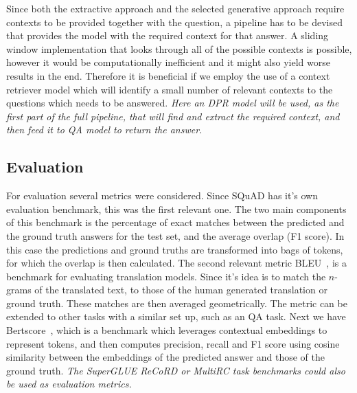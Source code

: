 \documentclass[fleqn,moreauthors,10pt]{ds_report}
\begin{document}
Since both the extractive approach and the selected generative approach require contexts to be provided together with the question, a pipeline has to be devised that provides the model with the required context for that answer.
A sliding window implementation that looks through all of the possible contexts is possible, however it would be computationally inefficient and it might also yield worse results in the end.
Therefore it is beneficial if we employ the use of a context retriever model which will identify a small number of relevant contexts to the questions which needs to be answered.
{\it Here an DPR model will be used, as the first part of the full pipeline, that will find and extract the required context, and then feed it to QA model to return the answer.}

\subsection*{Evaluation}
For evaluation several metrics were considered. Since SQuAD has it's own evaluation benchmark, this was the first relevant one. 
The two main components of this benchmark is the percentage of exact matches between the predicted and the ground truth answers for the test set, and the average overlap (F1 score). 
In this case the predictions and ground truths are transformed into bags of tokens, for which the overlap is then calculated.
The second relevant metric BLEU~\cite{papineni2002bleu}, is a benchmark for evaluating translation models.
Since it's idea is to match the $n$-grams of the translated text, to those of the human generated translation or ground truth. These matches are then averaged geometrically.
The metric can be extended to other tasks with a similar set up, such as an QA task.
Next we have Bertscore~\cite{zhang2019bertscore}, which is a benchmark which leverages contextual embeddings to represent tokens, and then computes precision, recall and F1 score using cosine similarity between the embeddings of the predicted answer and those of the ground truth.
{\it The SuperGLUE ReCoRD or MultiRC task benchmarks could also be used as evaluation metrics.}



\end{document}
